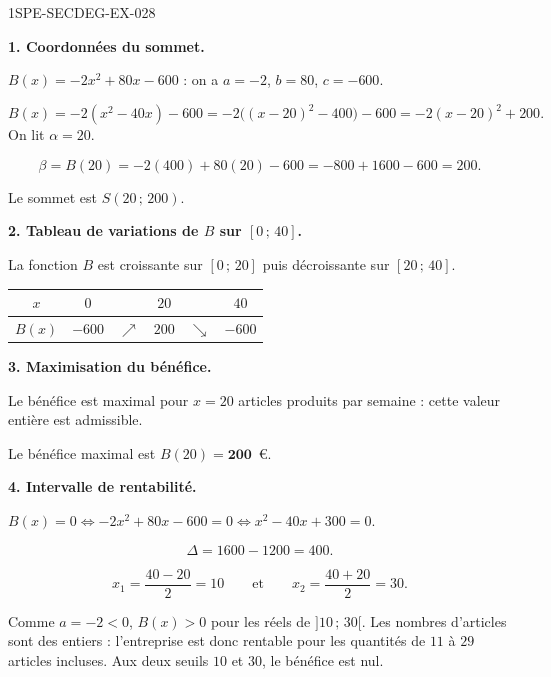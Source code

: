 \begin{corrige}{1SPE-SECDEG-EX-028}

\textbf{1. Coordonnées du sommet.}


$B(x) = -2x^2 + 80x - 600$ : on a $a = -2$, $b = 80$, $c = -600$.

\[B(x)=-2(x^2-40x)-600
=-2\bigl((x-20)^2-400\bigr)-600=-2(x-20)^2+200.\]
On lit $\alpha=20$.

\[\beta = B(20) = -2(400) + 80(20) - 600 = -800 + 1600 - 600 = 200.\]

Le sommet est $S(20\,;\,200)$.

\medskip
\textbf{2. Tableau de variations de $B$ sur $[0\,;\,40]$.}


La fonction $B$ est croissante sur $[0\,;\,20]$ puis décroissante sur $[20\,;\,40]$.

\medskip
\begin{center}
\begin{tabular}{|c|ccccc|}
\hline
$x$ & $0$ & & $20$ & & $40$ \\
\hline
$B(x)$ & $-600$ & $\nearrow$ & $200$ & $\searrow$ & $-600$ \\
\hline
\end{tabular}
\end{center}

\medskip
\textbf{3. Maximisation du bénéfice.}


Le bénéfice est maximal pour $x = 20$ articles produits par semaine : cette
valeur entière est admissible.

Le bénéfice maximal est $B(20) = \mathbf{200}$~\euro.

\medskip
\textbf{4. Intervalle de rentabilité.}


$B(x) = 0 \iff -2x^2 + 80x - 600 = 0 \iff x^2 - 40x + 300 = 0$.

\[\Delta = 1600 - 1200 = 400.\]

\[x_1 = \frac{40 - 20}{2} = 10 \qquad \text{et} \qquad x_2 = \frac{40 + 20}{2} = 30.\]

Comme $a = -2 < 0$, $B(x)>0$ pour les réels de $]10\,;\,30[$.
Les nombres d'articles sont des entiers : l'entreprise est donc rentable
pour les quantités de $11$ à $29$ articles incluses. Aux deux seuils $10$ et
$30$, le bénéfice est nul.

\end{corrige}
